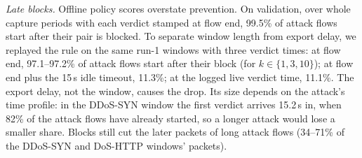 \emph{Late blocks.} Offline policy scores overstate prevention. On validation, over whole capture periods with each verdict stamped at flow end, 99.5\% of attack flows start after their pair is blocked. To separate window length from export delay, we replayed the rule on the same run-1 windows with three verdict times: at flow end, 97.1--97.2\% of attack flows start after their block (for $k\in\{1,3,10\}$); at flow end plus the 15\,s idle timeout, 11.3\%; at the logged live verdict time, 11.1\%. The export delay, not the window, causes the drop. Its size depends on the attack's time profile: in the DDoS-SYN window the first verdict arrives 15.2\,s in, when 82\% of the attack flows have already started, so a longer attack would lose a smaller share. Blocks still cut the later packets of long attack flows (34--71\% of the DDoS-SYN and DoS-HTTP windows' packets).
